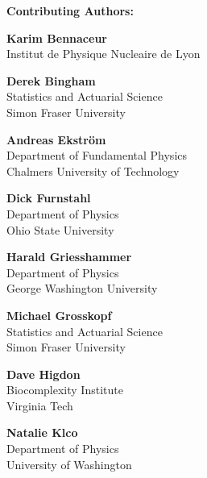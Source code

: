 {\bf \large Contributing Authors:}
\vspace{5mm}

\begin{minipage}[t]{0.5\linewidth}

\setlength\parskip{\baselineskip}

\textbf{Karim Bennaceur}\\
Institut de Physique Nucleaire de Lyon

\textbf{Derek Bingham}\\
Statistics and Actuarial Science\\
Simon Fraser University

\textbf{Andreas Ekström}\\
Department of Fundamental Physics\\
Chalmers University of Technology

\textbf{Dick Furnstahl}\\
Department of Physics\\ 
Ohio State University

\textbf{Harald Griesshammer}\\
Department of Physics\\
George Washington University

\textbf{Michael Grosskopf}\\
Statistics and Actuarial Science\\
Simon Fraser University

\textbf{Dave Higdon}\\
Biocomplexity Institute\\
Virginia Tech

\textbf{Natalie Klco}\\
Department of Physics\\
University of Washington


\end{minipage}
\hfill
